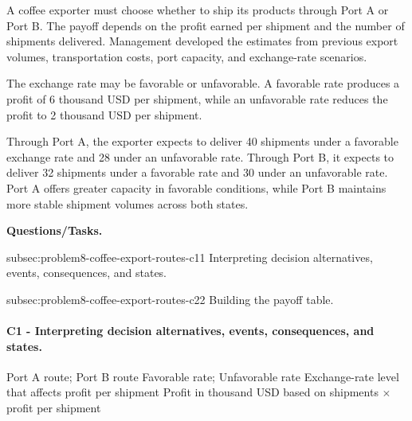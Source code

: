 	A coffee exporter must choose whether to ship its products through Port A or Port B. The payoff depends on the profit earned per shipment and the number of shipments delivered. Management developed the estimates from previous export volumes, transportation costs, port capacity, and exchange-rate scenarios.
	
	The exchange rate may be favorable or unfavorable. A favorable rate produces a profit of 6 thousand USD per shipment, while an unfavorable rate reduces the profit to 2 thousand USD per shipment.
	
	Through Port A, the exporter expects to deliver 40 shipments under a favorable exchange rate and 28 under an unfavorable rate. Through Port B, it expects to deliver 32 shipments under a favorable rate and 30 under an unfavorable rate. Port A offers greater capacity in favorable conditions, while Port B maintains more stable shipment volumes across both states.

	\textbf{Questions/Tasks.}
	\begin{enumerate}
		\CriterionTask
		{subsec:problem8-coffee-export-routes-c1}{1}
		{Interpreting decision alternatives, events, consequences, and states.}

		\CriterionTask
		{subsec:problem8-coffee-export-routes-c2}{2}
		{Building the payoff table.}
	\end{enumerate}

\paragraph*{C1 - Interpreting decision alternatives, events, consequences, and states.}
	\label{subsec:problem8-coffee-export-routes-c1}
	\DecisionElementsTable
	{Port A route; Port B route}
	{Favorable rate; Unfavorable rate}
	{Exchange-rate level that affects profit per shipment}
	{Profit in thousand USD based on shipments $\times$ profit per shipment}


